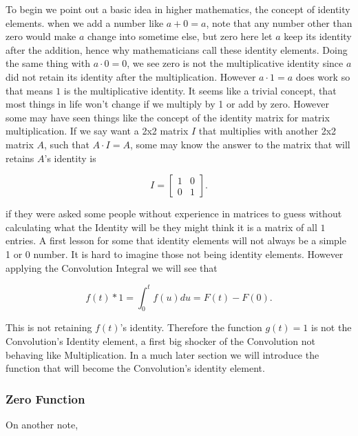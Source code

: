 \documentclass[12pt]{article}
\begin{document}
To begin we point out a basic idea in higher mathematics, the concept of identity elements. when we add a number like $a+0=a$, note that any number other than zero would make $a$ change into sometime else, but zero here let $a$ keep its identity after the addition, hence why mathematicians call these identity elements. Doing the same thing with $a\cdot0=0$, we see zero is not the multiplicative identity since $a$ did not retain its identity after the multiplication. However $a\cdot1=a$ does work so that means $1$ is the multiplicative identity. It seems like a trivial concept, that most things in life won't change if we multiply by 1 or add by zero. However some may have seen things like the concept of the identity matrix for matrix multiplication. If we say want a 2x2 matrix $I$ that multiplies with another 2x2 matrix $A$, such that $A\cdot I = A$, some may know the answer to the matrix that will retains $A$'s identity is 

\begin{equation*}
    I=\begin{bmatrix}
  1 & 0  \\
  0 & 1
 \end{bmatrix}.
\end{equation*}

if they were asked some people without experience in matrices to guess without calculating what the Identity will be they might think it is a matrix of all $1$ entries. A first lesson for some that identity elements will not always be a simple 1 or 0 number. It is hard to imagine those not being identity elements. However applying the Convolution Integral we will see that

\begin{equation*}
    f(t) \ast 1 = \int_{0}^{t} f(u) du=F(t)-F(0).
\end{equation*}

This is not retaining $f(t)$'s identity. Therefore the function $g(t)=1$ is not the Convolution's Identity element, a first big shocker of the Convolution not behaving like Multiplication. In a much later section we will introduce the function that will become the Convolution's identity element. \\

\subsubsection{Zero Function}

On another note,
\end{document}
